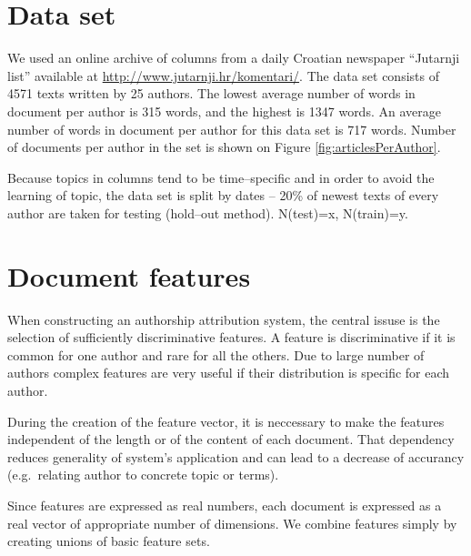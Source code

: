 \documentclass[11pt,english]{article}
\begin{document}
\begin{multicols}{2}
\section{Data set}
\label{sec:podatci}
We used an online archive of columns from a daily Croatian newspaper ``Jutarnji list'' available at \url{http://www.jutarnji.hr/komentari/}. The data set
consists of 4571 texts written by 25 authors. The lowest average number of words
in document per author is 315 words, and the highest is 1347 words. An
average number of words in document per author for this data set is 717 words. Number
of documents per author in the set is shown on Figure
\ref{fig:articlesPerAuthor}.

Because topics in columns tend to be time--specific and in order to avoid the learning of topic, the data set is split by dates -- 20\% of newest texts of every author are taken for testing (hold--out method). N(test)=x, N(train)=y.

\begin{minipage}{0.8\linewidth}
\vspace{10pt}
\centerline{\resizebox{1.4\linewidth}{!}{}}%
%
\label{fig:articlesPerAuthor}
\end{minipage}

\section{Document features}
When constructing an authorship attribution system, the central issuse is the selection of sufficiently discriminative features. A feature is
discriminative if it is common for one author and rare for all the others. Due to large number of authors complex features are very useful if their
distribution is specific for each author. %


During the creation of the feature vector, it is neccessary to make the
features independent of the length or of the content of each document. That dependency reduces
generality of system's application and can lead to a decrease of accurancy
(e.g.\ relating author to concrete topic or terms).

Since features are expressed as real numbers, each document is expressed as a real vector of appropriate number of dimensions. We combine features simply by creating unions of basic feature sets.


\end{multicols}
\end{document}
